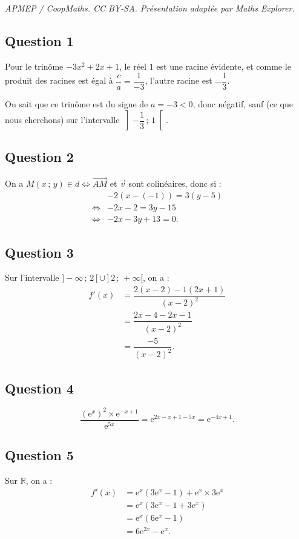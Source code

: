 \documentclass[10pt]{article}
\providecommand{\e}{{\mathrm{e}}}
\begin{document}
\noindent\textit{APMEP / CoopMaths. CC BY-SA. Présentation adaptée par Maths Explorer.}\par\medskip
\subsection*{Question 1}

Pour le trinôme \(-3x^2 + 2x + 1\), le réel \(1\) est une racine évidente, et comme le produit des racines est égal à \(\dfrac{c}{a} = \dfrac{1}{-3}\), l'autre racine est \(-\dfrac{1}{3}\).  

On sait que ce trinôme est du signe de \(a = -3 < 0\), donc négatif, sauf (ce que nous cherchons) sur l'intervalle \(\left]-\dfrac{1}{3}\,;\,1\right[\).

\subsection*{Question 2}

On a \(M(x\,;\,y) \in \textit{d} \iff \overrightarrow{AM}\) et \(\vec{v}\) sont colinéaires, donc si :
\begin{align*}
&-2(x - (-1)) = 3(y - 5) \\
\iff &-2x - 2 = 3y - 15 \\
\iff &-2x - 3y + 13 = 0.
\end{align*}

\subsection*{Question 3}

Sur l'intervalle \(]-\infty\,;\,2[ \cup ]2\,;\,+\infty[\), on a :
\begin{align*}
f'(x) &= \dfrac{2(x - 2) - 1(2x + 1)}{(x - 2)^2} \\
&= \dfrac{2x - 4 - 2x - 1}{(x - 2)^2} \\
&= \dfrac{-5}{(x - 2)^2}.
\end{align*}

\subsection*{Question 4}

\[
\dfrac{(\e^x)^2 \times \e^{-x+1}}{\e^{5x}} = \e^{2x - x + 1 - 5x} = \e^{-4x + 1}.
\]

\subsection*{Question 5}

Sur \(\mathbb{R}\), on a :
\begin{align*}
f'(x) &= \e^x(3\e^x - 1) + \e^x \times 3\e^x \\
&= \e^x(3\e^x - 1 + 3\e^x) \\
&= \e^x(6\e^x - 1) \\
&= 6\e^{2x} - \e^x.
\end{align*}
\end{document}
